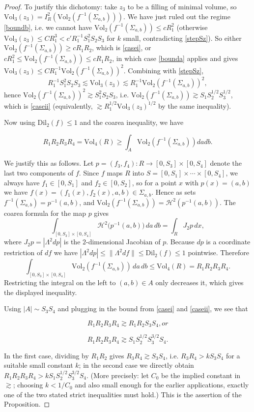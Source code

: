 \documentclass{amsart}
\newtheorem*{theorem 1}{Theorem 1}
\newtheorem*{theorem 2}{Theorem 2}
\newtheorem*{theorem 3}{Theorem 3}
\numberwithin{equation}{section}
\newcommand{\Dil}{\textrm{Dil}}
\newcommand{\Vol}{\textrm{Vol}}
\begin{document}
\begin{proof}
To justify this dichotomy: take $z_3$ to be a filling of minimal
volume, so $\Vol_3(z_3) = I_R^2(\Vol_2(f^{-1}(\Sigma_{a,b})))$.
We have just ruled out the regime \eqref{boundb}, i.e. we cannot
have $\Vol_2(f^{-1}(\Sigma_{a,b})) \le c R_1^2$ (otherwise
$\Vol_3(z_3) \le C R_1^3 < c' R_1^{-1} S_1^2 S_2 S_3$ for $k$ small,
contradicting \eqref{stepSz}).  So either
$\Vol_2(f^{-1}(\Sigma_{a,b})) \ge c R_1 R_2$, which is
\eqref{casei}, or $c R_1^2 \le \Vol_2(f^{-1}(\Sigma_{a,b})) \le c
R_1 R_2$, in which case \eqref{bounda} applies and gives
$\Vol_3(z_3) \le C R_1^{-1}\Vol_2(f^{-1}(\Sigma_{a,b}))^2$.
Combining with \eqref{stepSz},
$$ R_1^{-1} S_1^2 S_2 S_3 \lesssim \Vol_3(z_3) \lesssim R_1^{-1}
   \Vol_2(f^{-1}(\Sigma_{a,b}))^2, $$
hence $\Vol_2(f^{-1}(\Sigma_{a,b}))^2 \gtrsim S_1^2 S_2 S_3$, i.e.
$\Vol_2(f^{-1}(\Sigma_{a,b})) \gtrsim S_1 S_2^{1/2} S_3^{1/2}$,
which is \eqref{caseii} (equivalently, $\gtrsim R_1^{1/2}
\Vol_3(z_3)^{1/2}$ by the same inequality).

Now using $\Dil_2(f) \le 1$ and the coarea inequality,  we have

$$ R_1 R_2 R_3 R_4 = \Vol_4 (R) \ge \int_{A} \Vol_2(f^{-1}(\Sigma_{a,b})) da db. $$

We justify this as follows.  Let $p = (f_3, f_4): R \to [0,S_3]
\times [0, S_4]$ denote the last two components of $f$.  Since $f$
maps $R$ into $S = [0,S_1]\times\cdots\times[0,S_4]$, we always have
$f_1 \in [0,S_1]$ and $f_2 \in [0,S_2]$, so for a point $x$ with
$p(x) = (a,b)$ we have $f(x) = (f_1(x),f_2(x),a,b) \in
\Sigma_{a,b}$.  Hence as sets $f^{-1}(\Sigma_{a,b}) = p^{-1}(a,b)$,
and $\Vol_2(f^{-1}(\Sigma_{a,b})) = \mathcal H^2(p^{-1}(a,b))$.
The coarea formula for the map $p$ gives
$$ \int_{[0,S_3]\times[0,S_4]} \mathcal H^2\big(p^{-1}(a,b)\big)\,da\,db
   = \int_R J_2 p \, dx, $$
where $J_2 p = |\Lambda^2 dp|$ is the $2$-dimensional Jacobian of
$p$.  Because $dp$ is a coordinate restriction of $df$ we have
$|\Lambda^2 dp| \le \|\Lambda^2 df\| \le \Dil_2(f) \le 1$
pointwise.  Therefore
$$ \int_{[0,S_3]\times[0,S_4]} \Vol_2(f^{-1}(\Sigma_{a,b}))\,da\,db
   \le \Vol_4(R) = R_1 R_2 R_3 R_4. $$
Restricting the integral on the left to $(a,b)\in A$ only decreases
it, which gives the displayed inequality.

Using $|A| \sim S_3 S_4$ and plugging in the bound from \eqref{casei} and \eqref{caseii},  we see that

$$ R_1 R_2 R_3 R_4 \gtrsim R_1 R_2 S_3 S_4,  or $$

$$ R_1 R_2 R_3 R_4 \gtrsim S_1 S_2^{1/2} S_3^{3/2} S_4. $$

In the first case, dividing by $R_1 R_2$ gives $R_3 R_4 \gtrsim S_3
S_4$, i.e. $R_3 R_4 > k S_3 S_4$ for a suitable small constant $k$;
in the second case we directly obtain $R_1 R_2 R_3 R_4 > k S_1
S_2^{1/2} S_3^{3/2} S_4$.  (More precisely: let $C_0$ be the
implied constant in $\gtrsim$; choosing $k < 1/C_0$ and also small
enough for the earlier applications, exactly one of the two stated
strict inequalities must hold.)  This is the assertion of the
Proposition.
\end{proof}
\end{document}
